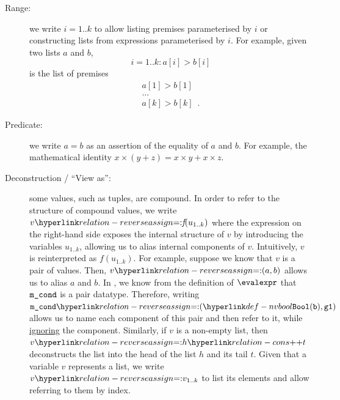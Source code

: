 \begin{description}
  \item[Range:] we write $i=1..k$ to allow listing premises parameterised by $i$ or constructing
  lists from expressions parameterised by $i$.
  For example, given two lists $a$ and $b$,
  \[
    i=1..k: a[i] > b[i]
  \]
  is the list of premises
  \[
    \begin{array}{l}
    a[1] > b[1]\\
    \ldots\\
    a[k] > b[k] \enspace.
    \end{array}
  \]

  \item[Predicate:] we write $a = b$ as an assertion of the equality of $a$ and $b$.
  For example, the mathematical identity $x \times (y + z) = x \times y + x \times z$.

  \hypertarget{relation-reverseassign}{}
  \item[Deconstruction / ``View as'':] some values, such as tuples, are compound. In order to refer to the structure
  of compound values, we write $v \reverseeqdef \textit{f}(u_{1..k})$ where the expression on the right-hand side exposes the internal structure of $v$ by introducing the variables
  $u_{1..k}$, allowing us to alias internal components of $v$.
  Intuitively, $v$ is reinterpreted as $\textit{f}(u_{1..k})$.
  For example, suppose we know that $v$ is a pair of values.
  Then, $v \reverseeqdef (a, b)$ allows us to alias $a$ and $b$.
  In , we know from the definition of $\evalexpr$ that
  $\texttt{m\_cond}$ is a pair datatype.
  Therefore, writing $\mcond \reverseeqdef (\nvbool(\vb), \vgone)$ allows us to name each component of this pair
  and then refer to it, while \hyperlink{def-ignore}{ignoring} the \staticenvironmentterm{} component.
  Similarly, if $v$ is a non-empty list, then $v \reverseeqdef h \cons{} t$ deconstructs the list into the
  head of the list $h$ and its tail $t$.
  Given that a variable $v$ represents a list, we write $v \reverseeqdef v_{1..k}$ to list its elements and allow
  referring to them by index.


\end{description}
